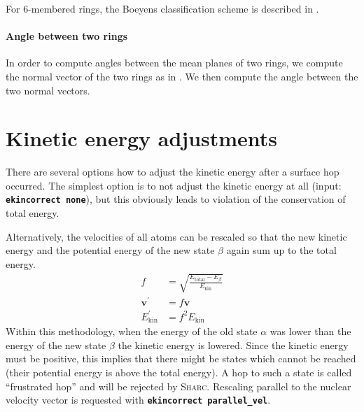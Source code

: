 \documentclass[a4paper,10pt,DIV=15,openany,twoside=false]{scrbook}
\newcommand{\sharc}{\textsc{Sharc}}
\newcommand{\ttt}[1]{\textbf{\texttt{#1}}}
\newcommand{\VEC}[1]{\ensuremath{\mathbf{#1}}}
\begin{document}
For 6-membered rings, the Boeyens classification scheme is described in \cite{Boeyens1976JCMS}.

\paragraph{Angle between two rings}

In order to compute angles between the mean planes of two rings, we compute the normal vector of the two rings as in \cite{Cremer1975JACS}.
We then compute the angle between the two normal vectors.


\section{Kinetic energy adjustments}\label{met:ekinadj}

There are several options how to adjust the kinetic energy after a surface hop occurred. The simplest option is to not adjust the kinetic energy at all (input: \ttt{ekincorrect none}), but this obviously leads to violation of the conservation of total energy.

Alternatively, the velocities of all atoms can be rescaled so that the new kinetic energy and the potential energy of the new state $\beta$ again sum up to the total energy.
\begin{align}
  f&=\sqrt{\frac{E_{\text{total}}-E_\beta}{E_{\text{kin}}}}\\
  \VEC{v}^\prime&=f\VEC{v}\\
  E_{\text{kin}}^\prime&=f^2E_{\text{kin}}
\end{align}
Within this methodology, when the energy of the old state $\alpha$ was lower than the energy of the new state $\beta$ the kinetic energy is lowered. Since the kinetic energy must be positive, this implies that there might be states which cannot be reached (their potential energy is above the total energy). A hop to such a state is called ``frustrated hop'' and will be rejected by \sharc. Rescaling parallel to the nuclear velocity vector is requested with \ttt{ekincorrect parallel\_vel}.
\end{document}
